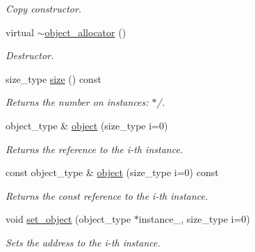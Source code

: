 \begin{DoxyCompactItemize}
\begin{DoxyCompactList}\small\item\em Copy constructor. \end{DoxyCompactList}\item 
\hypertarget{a00389_a3285d880aa6c7bfa8d6d2d82c232b6b3}{}virtual \hyperlink{a00389_a3285d880aa6c7bfa8d6d2d82c232b6b3}{$\sim$object\+\_\+allocator} ()\label{a00389_a3285d880aa6c7bfa8d6d2d82c232b6b3}

\begin{DoxyCompactList}\small\item\em Destructor. \end{DoxyCompactList}\item 
\hypertarget{a00389_a26b367189c1b8adc96fa3222f8583ec6}{}size\+\_\+type \hyperlink{a00389_a26b367189c1b8adc96fa3222f8583ec6}{size} () const \label{a00389_a26b367189c1b8adc96fa3222f8583ec6}

\begin{DoxyCompactList}\small\item\em Returns the number on instances\+: $\ast$/. \end{DoxyCompactList}\item 
\hypertarget{a00389_a8915efa9068e12e1331d54de85a1d58c}{}object\+\_\+type \& \hyperlink{a00389_a8915efa9068e12e1331d54de85a1d58c}{object} (size\+\_\+type i=0)\label{a00389_a8915efa9068e12e1331d54de85a1d58c}

\begin{DoxyCompactList}\small\item\em Returns the reference to the i-\/th instance. \end{DoxyCompactList}\item 
\hypertarget{a00389_a5bf2f472ba8e6251fcb93a20a9cf1f46}{}const object\+\_\+type \& \hyperlink{a00389_a5bf2f472ba8e6251fcb93a20a9cf1f46}{object} (size\+\_\+type i=0) const \label{a00389_a5bf2f472ba8e6251fcb93a20a9cf1f46}

\begin{DoxyCompactList}\small\item\em Returns the const reference to the i-\/th instance. \end{DoxyCompactList}\item 
\hypertarget{a00389_adc5b2b78b73519dc0e18fbd06408f768}{}void \hyperlink{a00389_adc5b2b78b73519dc0e18fbd06408f768}{set\+\_\+object} (object\+\_\+type $\ast$instance\+\_\+, size\+\_\+type i=0)\label{a00389_adc5b2b78b73519dc0e18fbd06408f768}

\begin{DoxyCompactList}\small\item\em Sets the address to the i-\/th instance. \end{DoxyCompactList}\end{DoxyCompactItemize}


